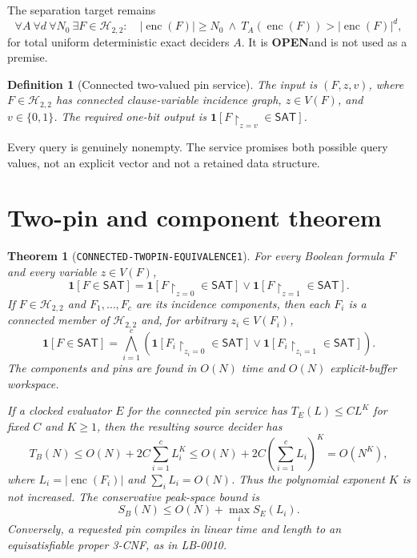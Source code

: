 \documentclass[11pt]{article}
\newtheorem{theorem}{Theorem}
\newtheorem{definition}{Definition}
\newcommand{\SAT}{\mathsf{SAT}}
\newcommand{\Htwo}{\mathcal H_{2,2}}
\newcommand{\OPEN}{\textbf{OPEN}}
\begin{document}
The separation target remains
\[
\tag{UCORE-TIME1}
\forall A\ \forall d\ \forall N_0\ \exists F\in\Htwo:\quad
 |\operatorname{enc}(F)|\ge N_0\ \wedge\
 T_A(\operatorname{enc}(F))>|\operatorname{enc}(F)|^d,
\]
for total uniform deterministic exact deciders $A$.  It is \OPEN and is not
used as a premise.

\begin{definition}[Connected two-valued pin service]
The input is $(F,z,v)$, where $F\in\Htwo$ has connected clause-variable
incidence graph, $z\in V(F)$, and $v\in\{0,1\}$.  The required one-bit output
is $\mathbf1[F\upharpoonright_{z=v}\in\SAT]$.
\end{definition}

Every query is genuinely nonempty.  The service promises both possible
query values, not an explicit vector and not a retained data structure.

\section{Two-pin and component theorem}

\begin{theorem}[\texttt{CONNECTED-TWOPIN-EQUIVALENCE1}]
For every Boolean formula $F$ and every variable $z\in V(F)$,
\[
 \mathbf1[F\in\SAT]
 =\mathbf1[F\upharpoonright_{z=0}\in\SAT]\vee
  \mathbf1[F\upharpoonright_{z=1}\in\SAT].                \tag{2}
\]
If $F\in\Htwo$ and $F_1,\ldots,F_c$ are its incidence components, then each
$F_i$ is a connected member of $\Htwo$ and, for arbitrary
$z_i\in V(F_i)$,
\[
 \mathbf1[F\in\SAT]
 =\bigwedge_{i=1}^c
   \left(
    \mathbf1[F_i\upharpoonright_{z_i=0}\in\SAT]\vee
    \mathbf1[F_i\upharpoonright_{z_i=1}\in\SAT]
   \right).                                                \tag{3}
\]
The components and pins are found in $O(N)$ time and $O(N)$ explicit-buffer
workspace.

If a clocked evaluator $E$ for the connected pin service has
$T_E(L)\le C L^K$ for fixed $C$ and $K\ge1$, then the resulting source
decider has
\[
 T_B(N)\le O(N)+2C\sum_{i=1}^c L_i^K
          \le O(N)+2C\left(\sum_{i=1}^cL_i\right)^K
          =O(N^K),                                         \tag{4}
\]
where $L_i=|\operatorname{enc}(F_i)|$ and
$\sum_iL_i=O(N)$.  Thus the polynomial exponent $K$ is not increased.
The conservative peak-space bound is
\[
 S_B(N)\le O(N)+\max_i S_E(L_i).                           \tag{5}
\]
Conversely, a requested pin compiles in linear time and length to an
equisatisfiable proper 3-CNF, as in LB-0010.
\end{theorem}
\end{document}
